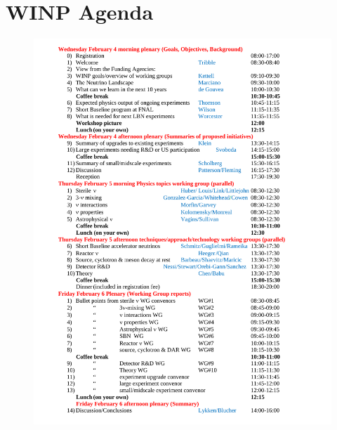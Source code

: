 \section{WINP Agenda}
\label{sec:Agenda}

\begin{figure}[h] 
\includegraphics[height=0.9\textheight]{WINP_Agenda_v12.pdf}
\end{figure}
